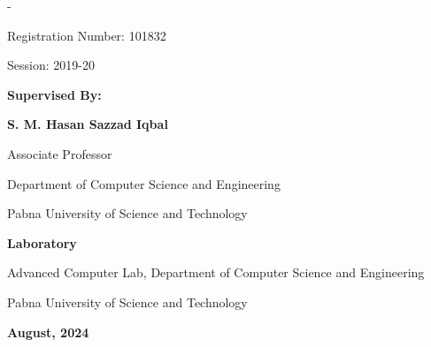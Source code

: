 \begin{titlingpage}
\begin{SingleSpace}
\begin{adjustwidth*}{\unitlength}{-\unitlength}
\begin{center}
Registration Number: 101832

Session: 2019-20

\vspace{1cm}

{\textbf{Supervised By:}}

{\textbf{S. M. Hasan Sazzad Iqbal}}

Associate Professor

Department of Computer Science and Engineering

Pabna University of Science and Technology

\vspace{1cm}

\textbf{Laboratory}

Advanced Computer Lab, Department of Computer Science and Engineering

Pabna University of Science and Technology

\vspace{0.5 cm}

{\textbf{August, 2024 }}

\end{center}



\end{adjustwidth*}
\end{SingleSpace}
\end{titlingpage}